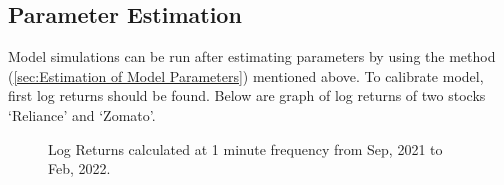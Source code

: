 \documentclass[paper.tex]{subfiles}
\begin{document}
    \subsection{Parameter Estimation}
    Model simulations can be run after estimating parameters by using the method (\ref{sec:Estimation of Model Parameters}) mentioned above.
    To calibrate model, first log returns should be found.
    Below are graph of log returns of two stocks `Reliance' and `Zomato'.
    \begin{figure}[ht!]
        \centering
        \qquad
        \caption{Log Returns calculated at 1 minute frequency from Sep, 2021 to Feb, 2022.}
        \label{fig: log-returns}
    \end{figure}
\end{document}
